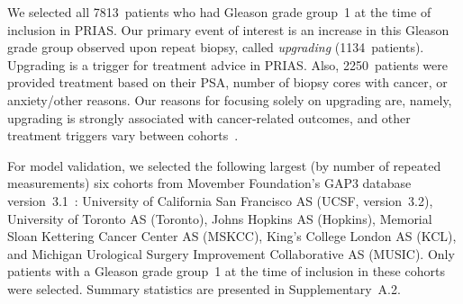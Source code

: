 We selected all 7813~patients who had Gleason grade group~1 at the time of inclusion in PRIAS. Our primary event of interest is an increase in this Gleason grade group observed upon repeat biopsy, called \textit{upgrading} (1134~patients). Upgrading is a trigger for treatment advice in PRIAS. Also, 2250~patients were provided treatment based on their PSA, number of biopsy cores with cancer, or anxiety/other reasons. Our reasons for focusing solely on upgrading are, namely, upgrading is strongly associated with cancer-related outcomes, and other treatment triggers vary between cohorts~\citep{nieboer2018active}.

For model validation, we selected the following largest (by number of repeated measurements) six cohorts from Movember Foundation's GAP3 database version~3.1~\citep{gap3_2018}: University of California San Francisco AS (UCSF, version~3.2), University of Toronto AS (Toronto), Johns Hopkins AS (Hopkins), Memorial Sloan Kettering Cancer Center AS (MSKCC), King's College London AS (KCL), and Michigan Urological Surgery Improvement Collaborative AS (MUSIC). Only patients with a Gleason grade group~1 at the time of inclusion in these cohorts were selected. Summary statistics are presented in Supplementary~A.2.